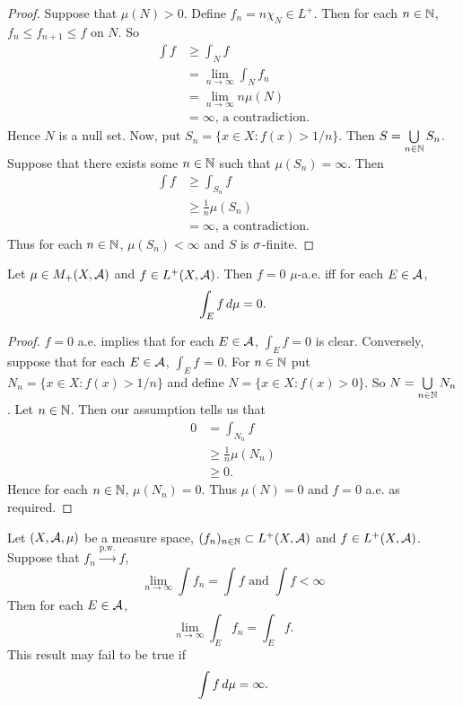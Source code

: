 \documentclass{book}
\begin{document}
	\begin{proof}
		Suppose that $\mu(N) > 0$. Define $f_n = n \chi_{N} \in L^+$. Then for each $n \in \mathbb{N}$, $f_n \leq f_{n+1} \leq f$ on $N$. So 
		\begin{align*}
			\int f 
			&\geq \int_N f\\ 
			&= \lim\limits_{n \rightarrow \infty} \int_N f_n\\ 
			&= \lim\limits_{n \rightarrow \infty} n\mu(N)\\
			&= \infty \text{, a contradiction.}
		\end{align*}
		Hence $N$ is a null set. Now, put $S_n = \{x \in X: f(x)>1/n\}$. Then $S = \bigcup \limits_{n \in \mathbb{N}}S_n$. Suppose that there exists some $n \in \mathbb{N}$ such that $\mu(S_n) = \infty$. Then 
		\begin{align*}
			\int f 
			&\geq \int_{S_n} f \\
			&\geq \frac{1}{n}\mu(S_n) \\
			&= \infty \text{, a contradiction.}
		\end{align*}
		Thus for each $n \in \mathbb{N}$, $\mu(S_n) < \infty$ and $S$ is $\sigma$-finite.
	\end{proof}
	
	\begin{ex}  
		Let $\mu \in M_+(X, \mathcal{A})$ and $f \in L^+(X, \mathcal{A})$. Then $f = 0$ $\mu$-a.e. iff for each $E \in \mathcal{A}$, 
		$$\int_E f \, d \mu = 0.$$
	\end{ex}
	
	\begin{proof}
		$f = 0$ a.e. implies that for each $E \in \mathcal{A}$, $\int_E f =0$ is clear. Conversely, suppose that for each $E \in \mathcal{A}$, $\int_E f$ = 0. For $n \in \mathbb{N}$ put $N_n = \{x \in X: f(x) > 1/n\}$ and define $N = \{x \in X: f(x)>0\}$. So $N = \bigcup\limits_{n \in \mathbb{N}} N_n$. Let $n \in \mathbb{N}$. Then our assumption tells us that 
		\begin{align*}
			0 
			&= \int_{N_n} f \\
			& \geq \frac{1}{n}\mu(N_n)\\
			& \geq 0.
		\end{align*} 
		Hence for each $n \in \mathbb{N}$, $\mu(N_n) = 0$. Thus $\mu(N) = 0$ and $f =0$ a.e. as required.
	\end{proof}
	
	\begin{ex} 
		Let $(X, \mathcal{A}, \mu)$ be a measure space, $(f_n)_{n \in \mathbb{N}} \subset L^+(X, \mathcal{A})$ and $f \in L^+(X, \mathcal{A})$. Suppose that $f_n \xrightarrow{\text{p.w.}} f$, 
		$$\lim \limits_{n \rightarrow \infty} \int f_n = \int f \text{ and } \int f < \infty$$
		Then for each $E \in \mathcal{A}$, 
		$$\lim \limits_{n \rightarrow \infty} \int_E f_n = \int_E f.$$ 
		This result may fail to be true if 
		$$\int f \, d \mu = \infty.$$
	\end{ex}
	
\end{document}

